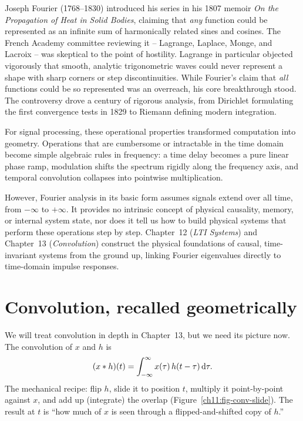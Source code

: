 \begin{historybox}
Joseph Fourier (1768--1830) introduced his series in his 1807 memoir
\emph{On the Propagation of Heat in Solid Bodies}, claiming that \emph{any}
function could be represented as an infinite sum of harmonically related sines and cosines.
The French Academy committee reviewing it -- Lagrange, Laplace, Monge, and Lacroix -- was
skeptical to the point of hostility. Lagrange in particular objected vigorously that smooth,
analytic trigonometric waves could never represent a shape with sharp corners or step
discontinuities. While Fourier's claim that \emph{all} functions could be so represented was an
overreach, his core breakthrough stood. The controversy drove a century of rigorous analysis,
from Dirichlet formulating the first convergence tests in 1829 to Riemann defining modern integration.

For signal processing, these operational properties transformed computation into geometry. Operations
that are cumbersome or intractable in the time domain become simple algebraic rules in frequency:
a time delay becomes a pure linear phase ramp, modulation shifts the spectrum rigidly along the frequency
axis, and temporal convolution collapses into pointwise multiplication.

However, Fourier analysis in its basic form assumes signals extend over all time, from $-\infty$
to $+\infty$. It provides no intrinsic concept of physical causality, memory, or internal system state,
nor does it tell us how to build physical systems that perform these operations step by step.
Chapter~12 (\emph{LTI Systems}) and Chapter~13 (\emph{Convolution}) construct the physical foundations
of causal, time-invariant systems from the ground up, linking Fourier eigenvalues directly to time-domain
impulse responses.
\end{historybox}

\section{Convolution, recalled geometrically}
\label{ch11:convolution-recall}

We will treat convolution in depth in Chapter~13, but we need its picture
now. The convolution of $x$ and $h$ is
\[
(x \ast h)(t) = \int_{-\infty}^{\infty} x(\tau)\, h(t - \tau)\, \mathrm{d} \tau.
\]
The mechanical recipe: flip $h$, slide it to position $t$, multiply it
point-by-point against $x$, and add up (integrate) the overlap
(Figure~\ref{ch11:fig-conv-slide}). The result at
$t$ is ``how much of $x$ is seen through a flipped-and-shifted copy of $h$.''


